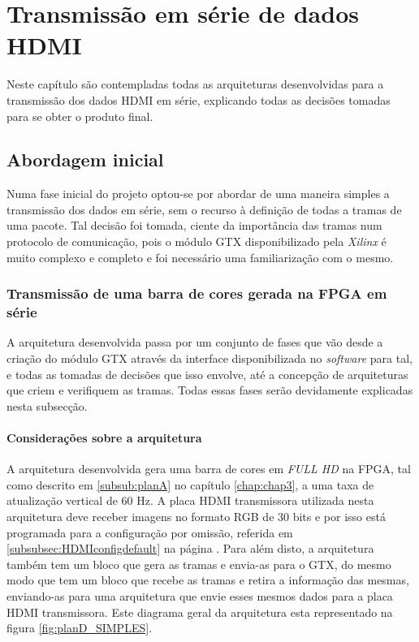 \chapter{Transmissão em série de dados HDMI} \label{chap:chap5}

Neste capítulo são contempladas todas as arquiteturas desenvolvidas para a transmissão dos dados HDMI em série, explicando todas as decisões tomadas para se obter o produto final. 

\section{Abordagem inicial}

Numa fase inicial do projeto optou-se por abordar de uma maneira simples a transmissão dos dados em série, sem o recurso à definição de todas a tramas de uma pacote. Tal decisão foi tomada, ciente da importância das tramas num protocolo de comunicação, pois o módulo GTX disponibilizado pela \textit{Xilinx} é muito complexo e completo e foi necessário uma familiarização com o mesmo.

\subsection{Transmissão de uma barra de cores gerada na FPGA em série} \label{sub:planD}

A arquitetura desenvolvida passa por um conjunto de fases que vão desde a criação do módulo GTX através da interface disponibilizada no \textit{software} para tal, e todas as tomadas de decisões que isso envolve, até a concepção de arquiteturas que criem e verifiquem as tramas. Todas essas fases serão devidamente explicadas nesta subsecção.

\subsubsection{Considerações sobre a arquitetura} \label{subsub:planD_considerações}

A arquitetura desenvolvida gera uma barra de cores em \textit{FULL HD} na FPGA, tal como descrito em \ref{subsub:planA} no capítulo \ref{chap:chap3}, a uma taxa de atualização vertical de 60 Hz. A placa HDMI transmissora utilizada nesta arquitetura deve receber imagens no formato RGB de 30 bits e por isso está programada para a configuração por omissão, referida em \ref{subsubsec:HDMIconfigdefault} na página \pageref{subsubsec:HDMIconfigdefault}. Para além disto, a arquitetura também tem um bloco que gera as tramas e envia-as para o GTX, do mesmo modo que tem um bloco que recebe as tramas e retira a informação das mesmas, enviando-as para uma arquitetura que envie esses mesmos dados para a placa HDMI transmissora. Este diagrama geral da arquitetura esta representado na figura \ref{fig:planD_SIMPLES}.

